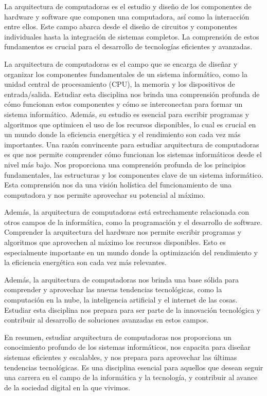 \documentclass[12pt,twoside]{templates/unerthesis}
\begin{document}
La arquitectura de computadoras es el estudio y diseño de los componentes de hardware y software que componen una computadora, así como la interacción entre ellos. Este campo abarca desde el diseño de circuitos y componentes individuales hasta la integración de sistemas completos. La comprensión de estos fundamentos es crucial para el desarrollo de tecnologías eficientes y avanzadas.

La arquitectura de computadoras es el campo que se encarga de diseñar y organizar los componentes fundamentales de un sistema informático, como la unidad central de procesamiento (CPU), la memoria y los dispositivos de entrada/salida. Estudiar esta disciplina nos brinda una comprensión profunda de cómo funcionan estos componentes y cómo se interconectan para formar un sistema informático. Además, su estudio es esencial para escribir programas y algoritmos que optimicen el uso de los recursos disponibles, lo cual es crucial en un mundo donde la eficiencia energética y el rendimiento son cada vez más importantes.
Una razón convincente para estudiar arquitectura de computadoras es que nos permite comprender cómo funcionan los sistemas informáticos desde el nivel más bajo. Nos proporciona una comprensión profunda de los principios fundamentales, las estructuras y los componentes clave de un sistema informático. Esta comprensión nos da una visión holística del funcionamiento de una computadora y nos permite aprovechar su potencial al máximo.

Además, la arquitectura de computadoras está estrechamente relacionada con otros campos de la informática, como la programación y el desarrollo de software. Comprender la arquitectura del hardware nos permite escribir programas y algoritmos que aprovechen al máximo los recursos disponibles. Esto es especialmente importante en un mundo donde la optimización del rendimiento y la eficiencia energética son cada vez más relevantes.

Además, la arquitectura de computadoras nos brinda una base sólida para comprender y aprovechar las nuevas tendencias tecnológicas, como la computación en la nube, la inteligencia artificial y el internet de las cosas. Estudiar esta disciplina nos prepara para ser parte de la innovación tecnológica y contribuir al desarrollo de soluciones avanzadas en estos campos.

En resumen, estudiar arquitectura de computadoras nos proporciona un conocimiento profundo de los sistemas informáticos, nos capacita para diseñar sistemas eficientes y escalables, y nos prepara para aprovechar las últimas tendencias tecnológicas. Es una disciplina esencial para aquellos que desean seguir una carrera en el campo de la informática y la tecnología, y contribuir al avance de la sociedad digital en la que vivimos.
\end{document}
